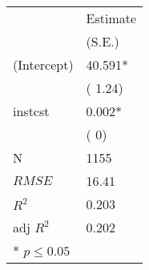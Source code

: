 \begin{center}
 \begin{tabular}{*{2}{l}}
 \hline
               & Estimate  \\
              & (S.E.)  \\
\hline 
 \hline
  (Intercept)   &    40.591* \\
    &   ( 1.24) \\
  instcst   &    0.002* \\
    &   ( 0) \\
 \hline 
N   &    1155 \\
 $RMSE$       & 16.41  \\
 $R^2$       & 0.203  \\
 adj $R^2$       & 0.202  \\
 \hline\hline
* $p \le 0.05$\end{tabular}
\end{center}
